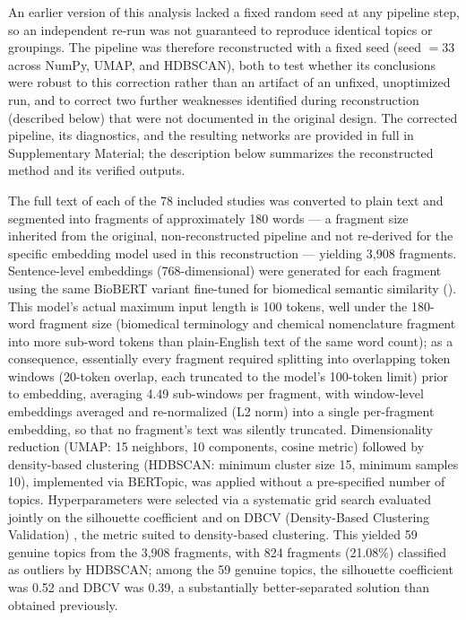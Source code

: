 \documentclass[5p,times,twocolumn]{elsarticle}
\begin{document}
An earlier version of this analysis lacked a fixed random seed at any pipeline step, so an independent re-run was not guaranteed to reproduce identical topics or groupings. The pipeline was therefore reconstructed with a fixed seed (seed $=33$ across NumPy, UMAP, and HDBSCAN), both to test whether its conclusions were robust to this correction rather than an artifact of an unfixed, unoptimized run, and to correct two further weaknesses identified during reconstruction (described below) that were not documented in the original design. The corrected pipeline, its diagnostics, and the resulting networks are provided in full in Supplementary Material; the description below summarizes the reconstructed method and its verified outputs.

The full text of each of the 78 included studies was converted to plain text and segmented into fragments of approximately 180 words --- a fragment size inherited from the original, non-reconstructed pipeline and not re-derived for the specific embedding model used in this reconstruction --- yielding 3,908 fragments. Sentence-level embeddings (768-dimensional) were generated for each fragment using the same BioBERT variant fine-tuned for biomedical semantic similarity (\texttt{}). This model's actual maximum input length is 100 tokens, well under the 180-word fragment size (biomedical terminology and chemical nomenclature fragment into more sub-word tokens than plain-English text of the same word count); as a consequence, essentially every fragment required splitting into overlapping token windows (20-token overlap, each truncated to the model's 100-token limit) prior to embedding, averaging 4.49 sub-windows per fragment, with window-level embeddings averaged and re-normalized (L2 norm) into a single per-fragment embedding, so that no fragment's text was silently truncated. Dimensionality reduction (UMAP: 15 neighbors, 10 components, cosine metric) followed by density-based clustering (HDBSCAN: minimum cluster size 15, minimum samples 10), implemented via BERTopic, was applied without a pre-specified number of topics. Hyperparameters were selected via a systematic grid search evaluated jointly on the silhouette coefficient \cite{ref87} and on DBCV (Density-Based Clustering Validation) \cite{ref88}, the metric suited to density-based clustering. This yielded 59 genuine topics from the 3,908 fragments, with 824 fragments (21.08\%) classified as outliers by HDBSCAN; among the 59 genuine topics, the silhouette coefficient was 0.52 and DBCV was 0.39, a substantially better-separated solution than obtained previously.
\end{document}
